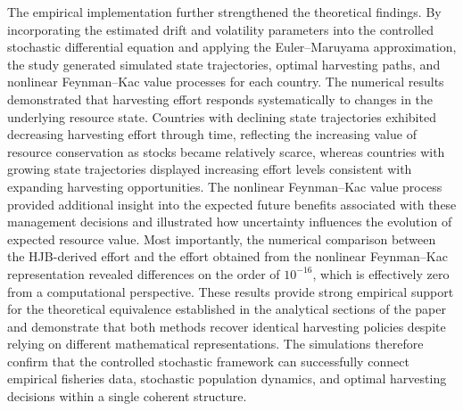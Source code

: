\documentclass[11pt]{article}
\begin{document}
	The empirical implementation further strengthened the theoretical findings. By incorporating the estimated drift and volatility parameters into the controlled stochastic differential equation and applying the Euler--Maruyama approximation, the study generated simulated state trajectories, optimal harvesting paths, and nonlinear Feynman--Kac value processes for each country. The numerical results demonstrated that harvesting effort responds systematically to changes in the underlying resource state. Countries with declining state trajectories exhibited decreasing harvesting effort through time, reflecting the increasing value of resource conservation as stocks became relatively scarce, whereas countries with growing state trajectories displayed increasing effort levels consistent with expanding harvesting opportunities. The nonlinear Feynman--Kac value process provided additional insight into the expected future benefits associated with these management decisions and illustrated how uncertainty influences the evolution of expected resource value. Most importantly, the numerical comparison between the HJB-derived effort and the effort obtained from the nonlinear Feynman--Kac representation revealed differences on the order of $10^{-16}$, which is effectively zero from a computational perspective. These results provide strong empirical support for the theoretical equivalence established in the analytical sections of the paper and demonstrate that both methods recover identical harvesting policies despite relying on different mathematical representations. The simulations therefore confirm that the controlled stochastic framework can successfully connect empirical fisheries data, stochastic population dynamics, and optimal harvesting decisions within a single coherent structure.
	
\end{document}

